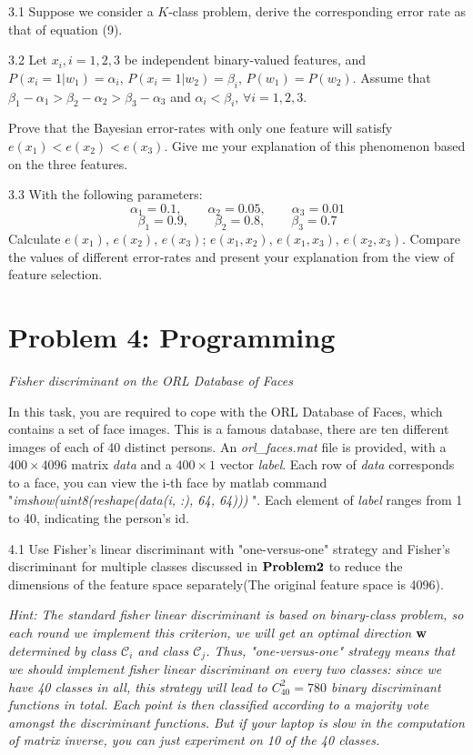 \documentclass{article}
\theoremstyle{definition}
\theoremstyle{definition}
\theoremstyle{remark}
\begin{document}
3.1 Suppose we consider a $K$-class problem, derive the corresponding error rate as that of equation (9).

3.2 Let $x_{i}, i=1, 2, 3$ be independent binary-valued features, and $P(x_{i}=1|w_{1})=\alpha_{i}$, $P(x_{i}=1|w_{2})=\beta_{i}$, $P(w_{1})=P(w_{2})$. Assume that $\beta_{1}-\alpha_{1}>\beta_{2}-\alpha_{2}>\beta_{3}-\alpha_{3}$ and $\alpha_{i}<\beta_{i}$, $\forall i=1, 2, 3$.

Prove that the Bayesian error-rates with only one feature will satisfy $e(x_{1})<e(x_{2})<e(x_{3})$. Give me your explanation of this phenomenon based on the three features.

3.3 With the following parameters:
\[
\alpha_{1}=0.1,\qquad \alpha_{2}=0.05,\qquad \alpha_{3}=0.01
\]\[
\beta_{1}=0.9,\qquad \beta_{2}=0.8,\qquad \beta_{3}=0.7
\]
Calculate $e(x_{1})$, $e(x_{2})$, $e(x_{3})$; $e(x_{1}, x_{2})$, $e(x_{1}, x_{3})$, $e(x_{2}, x_{3})$. Compare the values of different error-rates and present your explanation from the view of feature selection.

\section*{Problem 4: Programming}
\emph{Fisher discriminant on the ORL Database of Faces}

In this task, you are required to cope with the ORL Database of Faces, which contains a set of face images. This is a famous database, there are ten different images of each of 40 distinct persons. An \emph{orl\_faces.mat} file is provided, with a $400\times 4096$ matrix \emph{data} and a $400\times 1$ vector \emph{label}. Each row of \emph{data} corresponds to a face, you can view the i-th face by matlab command "\emph{imshow(uint8(reshape(data(i, :), 64, 64)))} ". Each element of \emph{label} ranges from 1 to 40, indicating the person's id.

4.1 Use Fisher's linear discriminant with "one-versus-one" strategy and Fisher's discriminant for multiple classes discussed in $\bold{Problem 2}$ to reduce the dimensions of the feature space separately(The original feature space is 4096).

\emph{Hint: The standard fisher linear discriminant is based on binary-class problem, so each round we implement this criterion, we will get an optimal direction $\bold{w}$ determined by class $\mathcal{C}_{i}$ and class $\mathcal{C}_{j}$. Thus, "one-versus-one" strategy means that we should implement fisher linear discriminant on every two classes: since we have 40 classes in all, this strategy will lead to $C_{40}^{2}=780$ binary discriminant functions in total. Each point is then classified according to a majority vote amongst the discriminant functions. But if your laptop is slow in the computation of matrix inverse, you can just experiment on 10 of the 40 classes.}
\end{document}
